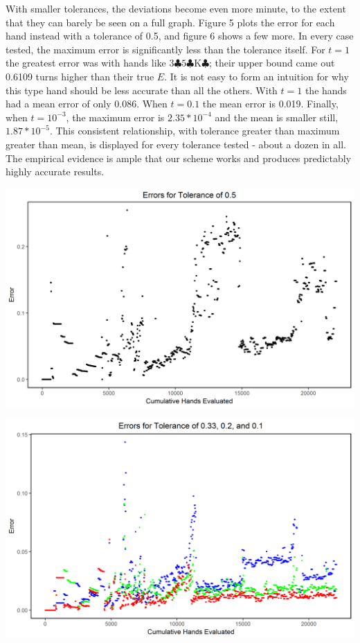 \documentclass[paper=a4, fontsize=11pt,twoside]{report}   %
\begin{document}
With smaller tolerances, the deviations become even more minute, to the extent that they can barely be seen on a full graph. Figure 5 plots the error for each hand instead with a tolerance of 0.5, and figure 6 shows a few more. In every case tested, the maximum error is significantly less than the tolerance itself. For $t=1$ the greatest error was with hands like $3\clubsuit 5\clubsuit \textrm{K}\clubsuit$; their upper bound came out 0.6109 turns higher than their true $E$. It is not easy to form an intuition for why this type hand should be less accurate than all the others. With $t=1$ the hands had a mean error of only 0.086. When $t=0.1$ the mean error is 0.019. Finally, when $t=10^{-3}$, the maximum error is $2.35*10^{-4}$ and the mean is smaller still, $1.87 * 10^{-5}$. This consistent relationship, with tolerance greater than maximum greater than mean, is displayed for every tolerance tested - about a dozen in all. The empirical evidence is ample that our scheme works and produces predictably highly accurate results.

\includegraphics[width=\textwidth]{fig5.png}

\includegraphics[width=\textwidth]{fig6.png}
\end{document}
